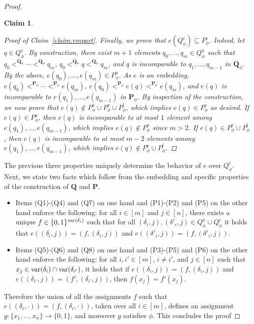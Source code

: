\documentclass[usletter]{article}
\newcommand{\pp}{\mathbf{P}}
\newcommand{\qq}{\mathbf{Q}}
\newtheorem{claim}{Claim}
\begin{document}
{\begin{proof}
\begin{claim}
\begin{proof}[Proof of Claim~\ref{claim:empart}]
Finally, we prove that $e(Q_{\phi}^c) \subseteq P_{\phi}^c$.  
Indeed, let $q \in Q_{\phi}^c$.  By construction, 
there exist $m+1$ elements $q_0,\ldots,q_m \in Q_{\phi}^a$ 
such that $q_0 <^{\qq_{\phi}} \cdots <^{\qq_{\phi}} q_{m}$, 
$q_0 <^{\qq_{\phi}} q <^{\qq_{\phi}} q_m$, 
and $q$ is incomparable to $q_1,\ldots,q_{m-1}$  in $\qq_{\phi}$.   
By the above, $e(q_0),\ldots,e(q_{m}) \in P_{\phi}^a$.  
As $e$ is an embedding, 
$e(q_0) <^{\pp_{\phi}} \cdots <^{\pp_{\phi}} e(q_{m})$, 
$e(q_0) <^{\pp_{\phi}} e(q) <^{\pp_{\phi}} e(q_m)$, 
and $e(q)$ is incomparable to $e(q_1),\ldots,e(q_{m-1})$ in $\pp_{\phi}$.  
By inspection of the construction, 
we now prove that $e(q) \not\in P_{\phi}^a \cup P_{\phi}^v \cup P_{\phi}^l$, 
which implies $e(q) \in P_{\phi}^c$ as desired.  
If $e(q) \in P_{\phi}^a$, 
then $e(q)$ is incomparable to at most $1$ element 
among $e(q_1),\ldots,e(q_{m-1})$, 
which implies $e(q) \not\in P_{\phi}^a$ since $m>2$.  
If $e(q) \in P_{\phi}^v \cup P_{\phi}^l$, 
then $e(q)$ is incomparable to at most $m-2$ elements 
among $e(q_1),\ldots,e(q_{m-1})$, 
which implies $e(q) \not\in P_{\phi}^v \cup P_{\phi}^l$.
\end{proof}
\end{claim}

The previous three properties uniquely determine the behavior of $e$ over $Q_{\phi}^l$.  
Next, we state two facts which follow from the embedding and specific properties of the construction of $\mathbf{Q}$ and $\mathbf{P}$.
\begin{itemize}
\item Items (Q1)-(Q4) and (Q7) on one hand and (P1)-(P2) and (P5) on the other hand enforce the following:
for all $i \in [m]$ and $j \in [n]$, 
there exists a unique $f \in \{0,1\}^{\textup{var}(\delta_i)}$ 
such that for all $(\delta_i,j),(\delta'_i,j) \in Q_{\phi}^a \cup Q_{\phi}^c$ 
it holds that $e((\delta_i,j))=(f,(\delta_i,j))$ and $e((\delta'_i,j))=(f,(\delta'_i,j))$. 
\item Items (Q5)-(Q6) and (Q8) on one hand  
and (P3)-(P5) and (P6) on the other hand enforce the following:
for all $i,i' \in [m]$, $i \neq i'$, and $j \in [n]$ 
such that $x_j \in \textup{var}(\delta_i) \cap \textup{var}(\delta_{i'})$, 
it holds that if $e((\delta_i,j))=(f,(\delta_i,j))$ and $e((\delta_{i'},j))=(f',(\delta_{i'},j))$, 
then $f(x_j)=f'(x_j)$.  
\end{itemize}

Therefore the union of all the assignments $f$ 
such that $e((\delta_i,\cdot))=(f,(\delta_i,\cdot))$, taken over all $i \in [m]$, 
defines an assignment $g \colon \{x_1,\ldots,x_n\} \to \{0,1\}$, 
and moreover $g$ satisfies $\phi$. This concludes the proof
\end{proof}}
\end{document}
